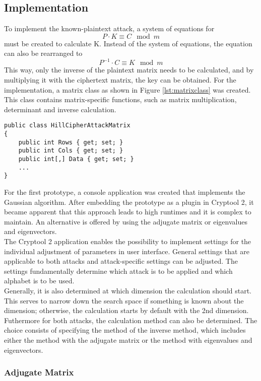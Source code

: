 \documentclass[conference]{IEEEtran}
\begin{document}
\subsection{Implementation}
To implement the known-plaintext attack, a system of equations for \[P \cdot K \equiv C \mod m\] must be created to calculate K.
Instead of the system of equations, the equation can also be rearranged to \[P^{-1} \cdot C \equiv K \mod m\] This way, only the inverse of the plaintext matrix needs to be calculated, and by multiplying it with the ciphertext matrix, the key can be obtained.
For the implementation, a matrix class as shown in Figure \ref{lst:matrixclass} was created. This class contains matrix-specific functions, such as matrix multiplication, determinant and inverse calculation.
\\
\begin{lstlisting}[caption={HillCipherAttackMatrix class}, label={lst:matrixclass}]
public class HillCipherAttackMatrix
{
    public int Rows { get; set; }
    public int Cols { get; set; }
    public int[,] Data { get; set; }
    ...
}
\end{lstlisting}

For the first prototype, a console application was created that implements the Gaussian algorithm. After embedding the prototype as a plugin in Cryptool 2, it became apparent that this approach leads to high runtimes and it is complex to maintain. An alternative is offered by using the adjugate matrix or eigenvalues and eigenvectors.
\\
The Cryptool 2 application enables the possibility to implement settings for the individual adjustment of parameters in user interface. General settings that are applicable to both attacks and attack-specific settings can be adjusted. The settings fundamentally determine which attack is to be applied and which alphabet is to be used.
\\
Generally, it is also determined at which dimension the calculation should start. This serves to narrow down the search space if something is known about the dimension; otherwise, the calculation starts by default with the 2nd dimension.
Futhermore for both attacks, the calculation method can also be determined. The choice consists of specifying the method of the inverse method, which includes either the method with the adjugate matrix or the method with eigenvalues and eigenvectors.
\\


\subsubsection{Adjugate Matrix}
\end{document}
